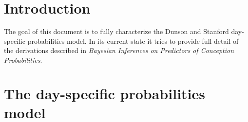 \documentclass[11pt]{article}
\begin{document}

\setcounter{section}{-1}
\section{Introduction}
The goal of this document is to fully characterize the Dunson and Stanford day-specific probabilities model.  In its current state it tries to provide full detail of the derivations described in \textit{Bayesian Inferences on Predictors of Conception Probabilities}.



\section{The day-specific probabilities model}





\end{document}
